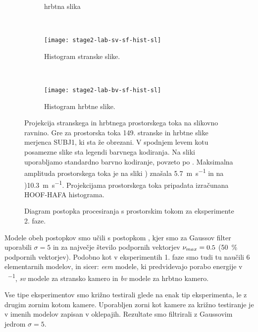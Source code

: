 \begin{figure}[!htb]
\begin{subfigure}[t]{0.45\columnwidth}
		\caption{hrbtna slika}
		\label{fig:stage2-lab-sf-bv-flo}
	\end{subfigure}
	~
	\begin{subfigure}[t]{0.45\columnwidth}
		\texttt{[image: stage2-lab-sv-sf-hist-sl]}
		\caption{Histogram stranske slike.}
	\end{subfigure}
	~
	\begin{subfigure}[t]{0.45\columnwidth}
		\texttt{[image: stage2-lab-bv-sf-hist-sl]}
		\caption{Histogram hrbtne slike.}
	\end{subfigure}
	\caption[Projekcije prostorskih tokov na slikovno ravnino]{Projekcija stranskega in hrbtnega prostorskega toka na slikovno ravnino. Gre za prostorska toka 149. stranske in hrbtne slike merjenca SUBJ1, ki sta že obrezani. V spodnjem levem kotu posamezne slike sta legendi barvnega kodiranja. Na sliki uporabljamo standardno barvno kodiranje, povzeto po \cite{baker2011database}. Maksimalna amplituda prostorskega toka je na sliki  ) znašala \SI{5.7}{\m\per\s} in na )\SI{10,3}{\m\per\s}. Projekcijama prostorskega toka pripadata izračunana HOOF-HAFA histograma.}
	\label{fig:prostorski-tok-stage2}
\end{figure}

\begin{figure}[!htb]
	\centering
	\resizebox{\columnwidth}{!}{}
	\caption[Diagram postopka s prostorskim tokom za eksperimente 2. faze]{Diagram postopka procesiranja s prostorskim tokom za eksperimente 2. faze.}
	\label{fig:diagram-procesiranja-sf-stage2}
\end{figure}
 
Modele obeh postopkov smo učili s postopkom \nurbf, kjer smo za Gaussov filter uporabili $\sigma=5$ in za največje število podpornih vektorjev $\nu_{max} =0.5$ (\SI{50}{\%} podpornih vektorjev). Podobno kot v eksperimentih 1. faze smo tudi tu naučili \num{6} elementarnih modelov, in sicer: \textit{eem} modele, ki predvidevajo porabo energije v \si{\kcal\per\min}, \textit{sv} modele za stransko kamero in \textit{bv} modele za hrbtno kamero. %

Vse tipe eksperimentov smo križno testirali glede na enak tip eksperimenta, le z drugim zornim kotom kamere. Uporabljen zorni kot kamere za križno testiranje je v imenih modelov zapisan v oklepajih.  Rezultate smo filtrirali z Gaussovim jedrom $\sigma=5$. 

